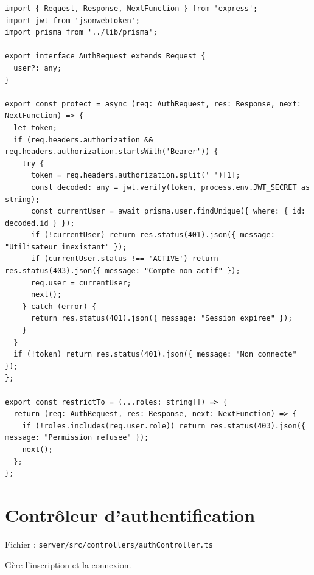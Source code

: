 \documentclass[12pt,a4paper]{article}
\begin{document}
\begin{lstlisting}[style=code]
import { Request, Response, NextFunction } from 'express';
import jwt from 'jsonwebtoken';
import prisma from '../lib/prisma';

export interface AuthRequest extends Request {
  user?: any;
}

export const protect = async (req: AuthRequest, res: Response, next: NextFunction) => {
  let token;
  if (req.headers.authorization && req.headers.authorization.startsWith('Bearer')) {
    try {
      token = req.headers.authorization.split(' ')[1];
      const decoded: any = jwt.verify(token, process.env.JWT_SECRET as string);
      const currentUser = await prisma.user.findUnique({ where: { id: decoded.id } });
      if (!currentUser) return res.status(401).json({ message: "Utilisateur inexistant" });
      if (currentUser.status !== 'ACTIVE') return res.status(403).json({ message: "Compte non actif" });
      req.user = currentUser;
      next();
    } catch (error) {
      return res.status(401).json({ message: "Session expiree" });
    }
  }
  if (!token) return res.status(401).json({ message: "Non connecte" });
};

export const restrictTo = (...roles: string[]) => {
  return (req: AuthRequest, res: Response, next: NextFunction) => {
    if (!roles.includes(req.user.role)) return res.status(403).json({ message: "Permission refusee" });
    next();
  };
};
\end{lstlisting}

\newpage

\section{Contrôleur d'authentification}

Fichier : \texttt{server/src/controllers/authController.ts}

Gère l'inscription et la connexion.
\end{document}
